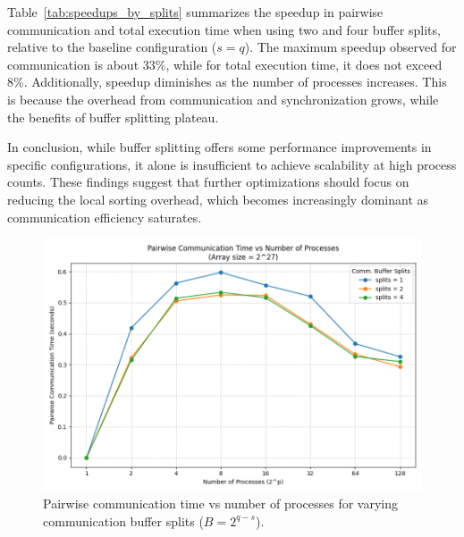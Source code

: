 \documentclass{article}
\begin{document}
Table~\ref{tab:speedups_by_splits} summarizes the speedup in pairwise communication and total execution time 
when using two and four buffer splits, relative to the baseline configuration ($s = q$). The maximum speedup 
observed for communication is about 33\%, while for total execution time, it does not exceed 8\%. Additionally,
speedup diminishes as the number of processes increases. This is because the overhead from communication and 
synchronization grows, while the benefits of buffer splitting plateau.

In conclusion, while buffer splitting offers some performance improvements in specific configurations, it alone
is insufficient to achieve scalability at high process counts. These findings suggest that further optimizations
should focus on reducing the local sorting overhead, which becomes increasingly dominant as communication 
efficiency saturates.

\begin{figure}
    \centering
    \includegraphics[width=1\linewidth]{figures/pairwise_comm_vs_procs.png}
    \caption{Pairwise communication time vs number of processes for varying communication buffer splits 
    ($B = 2^{q-s}$).}
    \label{fig:pairwise_comm_vs_procs}
\end{figure}
\end{document}
